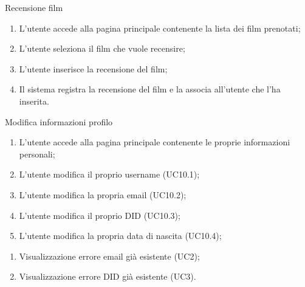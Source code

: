 \begin{usecase}{9}{Recensione film}\label{uc:recensione-film}
  \usecasemain{}
  
  \begin{enumerate}
    \item L'utente accede alla pagina principale contenente la lista dei film prenotati;
    \item L'utente seleziona il film che vuole recensire;
    \item L'utente inserisce la recensione del film;
    \item Il sistema registra la recensione del film e la associa all'utente che l'ha inserita.
  \end{enumerate}
\end{usecase}

\begin{usecase}{10}{Modifica informazioni profilo}\label{uc:modifica-informazioni-account}
  \usecasemain{}
  
  \begin{enumerate}
    \item L'utente accede alla pagina principale contenente le proprie informazioni personali;
    \item L'utente modifica il proprio username (UC10.1);
    \item L'utente modifica la propria email (UC10.2);
    \item L'utente modifica il proprio DID (UC10.3);
    \item L'utente modifica la propria data di nascita (UC10.4);
  \end{enumerate}

  \usecaseext{}
  \begin{enumerate}
    \item Visualizzazione errore email già esistente (UC2);
    \item Visualizzazione errore DID già esistente (UC3).
  \end{enumerate}
\end{usecase}

